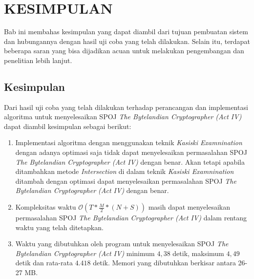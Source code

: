 \chapter{KESIMPULAN}
  Bab ini membahas kesimpulan yang dapat diambil dari tujuan pembuatan sistem dan hubungannya dengan hasil uji coba yang telah dilakukan. Selain itu, terdapat beberapa saran yang bisa dijadikan acuan untuk melakukan pengembangan dan penelitian lebih lanjut.
  \section{Kesimpulan}
 Dari hasil uji coba yang telah dilakukan terhadap perancangan dan implementasi algoritma untuk menyelesaikan SPOJ \textit{The Bytelandian Cryptographer (Act IV)} dapat diambil kesimpulan sebagai berikut:
 
 \begin{enumerate}
 \item Implementasi algoritma dengan menggunakan teknik \textit{Kasiski Examnination} dengan adanya optimasi saja tidak dapat menyelesaikan permasalahan SPOJ \textit{The Bytelandian Cryptographer (Act IV)} dengan benar. Akan tetapi apabila ditambahkan metode \textit{Intersection} di dalam teknik \textit{Kasiski Examnination} ditambah dengan optimasi dapat menyelesaikan permasalahan SPOJ \textit{The Bytelandian Cryptographer (Act IV)} dengan benar.
 \item Kompleksitas waktu $\mathcal{O}(T*\frac{M}{2}*(N+S))$ masih dapat menyelesaikan permasalahan SPOJ \textit{The Bytelandian Cryptographer (Act IV)} dalam rentang waktu yang telah ditetapkan.
 \item Waktu yang dibutuhkan oleh program untuk menyelesaikan SPOJ \textit{The Bytelandian Cryptographer (Act IV)} minimum $4,38$ detik, maksimum $4,49$ detik dan rata-rata $4.418$ detik. Memori yang dibutuhkan berkisar antara 26-27 MB. %
 \end{enumerate}
  
